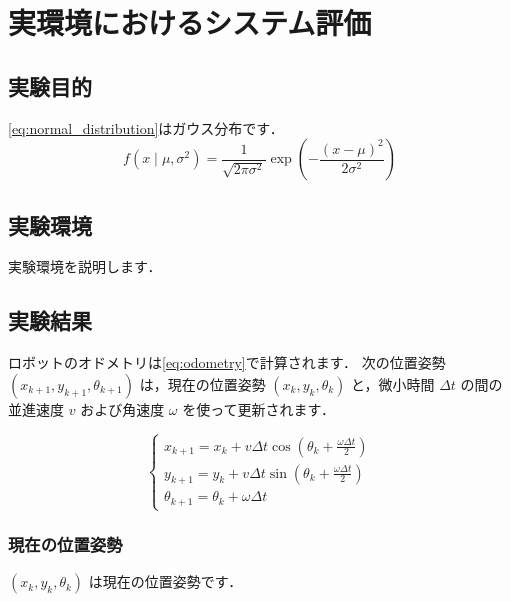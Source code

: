 \chapter{実環境におけるシステム評価}
\label{cha:field_experiments}
\graphicspath{{figures/05_field_experiments}}


\section{実験目的}
\label{sec:exp_purpose}

\eqref{eq:normal_distribution}はガウス分布です．
\begin{equation}
  f(x \mid \mu, \sigma^2) = \frac{1}{\sqrt{2\pi\sigma^2}} \exp\left(-\frac{(x-\mu)^2}{2\sigma^2}\right)
  \label{eq:normal_distribution}
\end{equation}



\section{実験環境}
\label{sec:exp_environment}

実験環境を説明します．


\section{実験結果}
\label{sec:exp_results}

ロボットのオドメトリは\eqref{eq:odometry}で計算されます．
次の位置姿勢 $(x_{k+1}, y_{k+1}, \theta_{k+1})$ は，現在の位置姿勢 $(x_k, y_k, \theta_k)$ と，微小時間 $\Delta t$ の間の並進速度 $v$ および角速度 $\omega$ を使って更新されます．

\begin{equation}
  \begin{cases}
    x_{k+1} = x_k + v \Delta t \cos(\theta_k + \frac{\omega \Delta t}{2}) \\
    y_{k+1} = y_k + v \Delta t \sin(\theta_k + \frac{\omega \Delta t}{2}) \\
    \theta_{k+1} = \theta_k + \omega \Delta t
  \end{cases}
  \label{eq:odometry}
\end{equation}

\subsection{現在の位置姿勢}
$(x_k, y_k, \theta_k)$ は現在の位置姿勢です．

